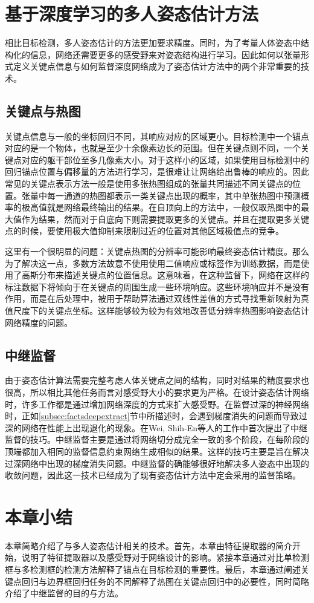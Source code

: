 \section{基于深度学习的多人姿态估计方法}
\label{sec:factspose}
相比目标检测，多人姿态估计的方法更加要求精度。同时，为了考量人体姿态中结构化的信息，网络还需要更多的感受野来对姿态结构进行学习。因此如何以张量形式定义关键点信息与如何监督深度网络成为了姿态估计方法中的两个非常重要的技术。

\subsection{关键点与热图}
\label{subsec:factsheatmaps}
关键点信息与一般的坐标回归不同，其响应对应的区域更小。目标检测中一个锚点对应的是一个物体，也就是至少十余像素边长的范围。但在关键点则不同，一个关键点对应的躯干部位至多几像素大小。对于这样小的区域，如果使用目标检测中的回归锚点位置与偏移量的方法进行学习，是很难让让网络给出鲁棒的响应的。因此常见的关键点表示方法一般是使用多张热图组成的张量共同描述不同关键点的位置。张量中每一通道的热图都表示一类关键点出现的概率，其中单张热图中预测概率的极高值就是网络最终输出的结果。在自顶向上的方法中，一般仅取热图中的最大值作为结果，然而对于自底向下则需要提取更多的关键点。并且在提取更多关键点的时候，要使用极大值抑制来限制过近的位置对其他区域极值点的竞争。

这里有一个很明显的问题：关键点热图的分辨率可能影响最终姿态估计精度。那么为了解决这一点，多数方法故意不使用使用二值响应或标签作为训练数据，而是使用了高斯分布来描述关键点的位置信息。这意味着，在这种监督下，网络在这样的标注数据下将倾向于在关键点的周围生成一些环境响应。这些环境响应并不是没有作用，而是在后处理中，被用于帮助算法通过双线性差值的方式寻找重新映射为真值尺度下的关键点坐标。这样能够较为较为有效地改善低分辨率热图影响姿态估计网络精度的问题。

\subsection{中继监督}
\label{subsec:factsintersupervision}
由于姿态估计算法需要完整考虑人体关键点之间的结构，同时对结果的精度要求也很高，所以相比其他任务而言对感受野大小的要求更为严格。在设计姿态估计网络时，许多工作都是通过增加网络深度的方式来扩大感受野。在监督过深的神经网络时，正如\ref{subsec:factsdeepextract}节中所描述时，会遇到梯度消失的问题而导致过深的网络在性能上出现退化的现象。在Wei, Shih-En等人的工作中\cite{wei2016convolutional}首次提出了中继监督的技巧。中继监督主要是通过将网络切分成完全一致的多个阶段，在每阶段的顶端都加入相同的监督信息约束网络生成相似的结果。这样的技巧主要是旨在解决过深网络中出现的梯度消失问题。中继监督的确能够很好地解决多人姿态中出现的收敛问题，因此这一技术已经成为了现有姿态估计方法中定会采用的监督策略。

\section{本章小结}
本章简略介绍了与多人姿态估计相关的技术。首先，本章由特征提取器的简介开始，说明了特征提取器以及感受野对于网络设计的影响。紧接本章通过对比单检测框与多检测框的检测方法解释了锚点在目标检测的重要性。最后，本章通过阐述关键点回归与边界框回归任务的不同解释了热图在关键点回归中的必要性，同时简略介绍了中继监督的目的与方法。
